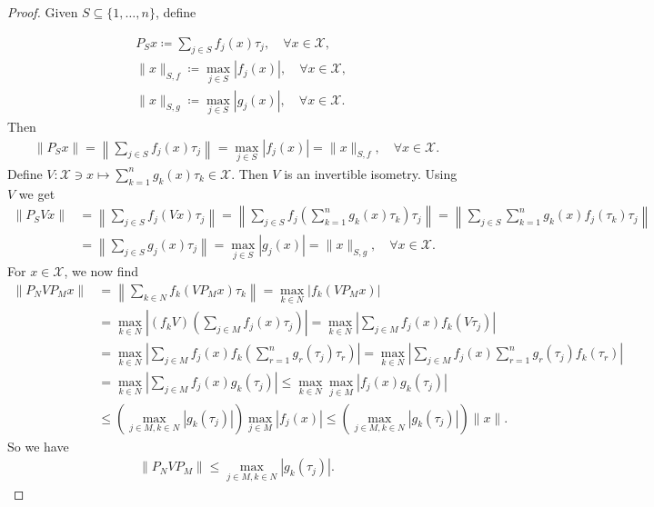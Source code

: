\documentclass{amsart}
\begin{document}
\begin{proof}
Given $S\subseteq \{1, \dots, n\}$, define 

\begin{align*}
	&P_Sx\coloneqq \sum_{j\in S}f_j(x)\tau_j, \quad \forall x \in \mathcal{X}, \\
	&\|x\|_{S, f}\coloneqq \displaystyle \max_{j \in S}|f_j(x)|, \quad \forall x \in \mathcal{X},\\
	&\|x\|_{S, g}\coloneqq \displaystyle \max_{j \in S}|g_j(x)|, \quad \forall x \in \mathcal{X}.
\end{align*}
Then 
\begin{align*}
	\|P_Sx\|=\left\|\sum_{j\in S}f_j(x)\tau_j\right\|=\displaystyle \max_{j \in S}|f_j(x)|=	\|x\|_{S, f}, \quad \forall x \in \mathcal{X}.
\end{align*}
Define $V:\mathcal{X}\ni x \mapsto \sum_{k=1}^{n}g_k(x)\tau_k \in \mathcal{X}$. Then $V$ is an invertible isometry. Using $V$ we get 
\begin{align*}
	\|P_SVx\|&=\left\|\sum_{j\in S}f_j(Vx)\tau_j\right\|=\left\|\sum_{j\in S}f_j\left(\sum_{k=1}^{n}g_k(x)\tau_k\right)\tau_j\right\|=\left\|\sum_{j\in S}\sum_{k=1}^{n}g_k(x)f_j(\tau_k)\tau_j\right\|\\
	&=\left\|\sum_{j\in S}g_j(x)\tau_j\right\|=\displaystyle \max_{j \in S}|g_j(x)|=	\|x\|_{S, g}, \quad \forall x \in \mathcal{X}.
\end{align*}
For $x \in \mathcal{X}$, we  now find 
\begin{align*}
	\|P_NVP_Mx\|&=\left\|\sum_{k\in N}f_k(VP_Mx)\tau_k\right\|=\max_{k \in N}|f_k(VP_Mx)|\\
	&=\max_{k \in N}\left|(f_kV) \left(\sum_{j\in M}f_j(x)\tau_j\right)\right|=\max_{k \in N}\left| \sum_{j\in M}f_j(x)f_k(V\tau_j)\right|\\
	&=\max_{k \in N}\left| \sum_{j\in M}f_j(x)f_k\left(\sum_{r=1}^{n}g_r(\tau_j)\tau_r\right)\right|
	=\max_{k \in N}\left| \sum_{j\in M}f_j(x)\sum_{r=1}^{n}g_r(\tau_j)f_k(\tau_r)\right|\\
	&=\max_{k \in N}\left| \sum_{j\in M}f_j(x)g_k(\tau_j)\right|\leq  \max_{k \in N}\max_{j \in M}|f_j(x)g_k(\tau_j)|\\
	&\leq \left(\max_{j \in M, k\in N}|g_k(\tau_j)|\right)\max_{j \in M}|f_j(x)|\leq \left(\max_{j \in M, k\in N}|g_k(\tau_j)|\right)\|x\|.
\end{align*}
So we have 
\begin{align}\label{FPVP}
	\|P_NVP_M\|\leq \displaystyle \max_{j \in M, k\in N}|g_k(\tau_j)|.
\end{align}

\end{proof}
\end{document}
